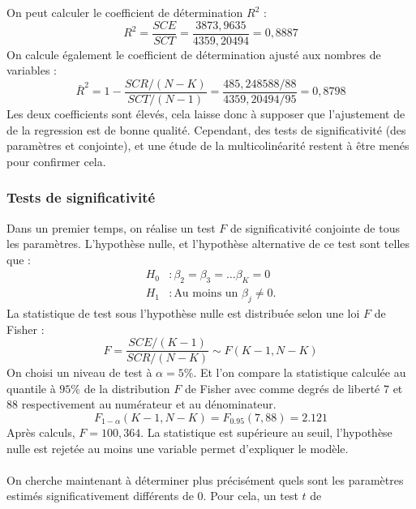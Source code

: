 \documentclass{article}
\begin{document}
On peut calculer le coefficient de détermination $R^{2}$ :
\begin{equation*}
    R^{2} = \frac{SCE}{SCT} = \frac{3873,9635}{4359,20494} = 0,8887
\end{equation*}
On calcule également le coefficient de détermination ajusté aux nombres de variables :
\begin{equation*}
    \bar{R}^{2} = 1 - \frac{SCR/(N-K)}{SCT/(N-1)} = \frac{485,248588/88}{4359,20494/95} = 0,8798
\end{equation*}
Les deux coefficients sont élevés, cela laisse donc à supposer que l'ajustement de de la regression est de bonne qualité. Cependant, des tests de 
significativité (des paramètres et conjointe), et une étude de la multicolinéarité restent à être menés pour confirmer cela.
\subsubsection{Tests de significativité}
\label{sec:testSigni1}
Dans un premier temps, on réalise un test $F$ de significativité conjointe de tous les paramètres. L'hypothèse nulle, et l'hypothèse alternative de ce test sont telles que :
\begin{equation*}
\begin{split}
    H_0 &: \beta_2 = \beta_3 = \dots \beta_K =0 \\
    H_1 &: \text{Au moins un }\beta_j \neq 0.
\end{split}
\end{equation*}
La statistique de test sous l'hypothèse nulle est distribuée selon une loi $F$ de Fisher :
\begin{equation*}
    F = \frac{SCE/(K-1)}{SCR/(N-K)} \sim F(K-1, N-K)
\end{equation*}
On choisi un niveau de test à $\alpha = 5\%$. Et l'on compare la statistique calculée au quantile à $95\%$ de la distribution $F$ de Fisher avec 
comme degrés de liberté $7$ et $88$ respectivement au numérateur et au dénominateur. 
\begin{equation*}
    F_{1-\alpha} (K-1, N-K) = F_{0.95}(7, 88) = 2.121
\end{equation*}
Après calculs, $F = 100,364$. La statistique est supérieure au seuil, l'hypothèse nulle est rejetée au moins une variable permet d'expliquer le modèle.
\\ \\
On cherche maintenant à déterminer plus précisément quels sont les paramètres estimés significativement différents de 0. Pour cela, un test $t$ de 
\end{document}
